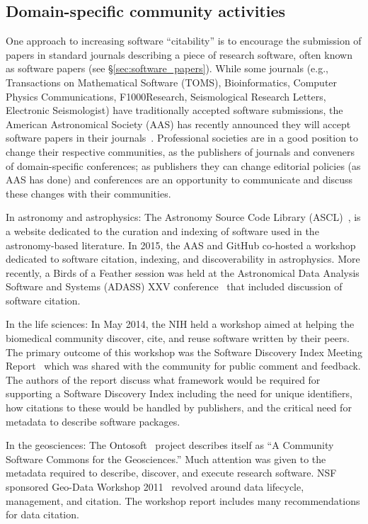 \documentclass[12pt, oneside]{amsart}
\begin{document}
\subsection{Domain-specific community activities}

One approach to increasing software ``citability'' is to encourage the
submission of papers in standard journals describing a piece of research
software, often known as software papers (see \S\ref{sec:software_papers}).
While some journals (e.g., Transactions on Mathematical Software (TOMS),
Bioinformatics, Computer Physics Communications, F1000Research,
Seismological Research Letters, Electronic Seismologist) have
traditionally accepted software submissions, the American Astronomical Society
(AAS) has recently announced they will accept software papers in their
journals~\cite{aas-sofware-papers}. Professional societies are in a good
position to change their respective communities, as the publishers of journals
and conveners of domain-specific conferences; as publishers they can change
editorial policies (as AAS has done) and conferences are an opportunity to
communicate and discuss these changes with their communities.

In astronomy and astrophysics: The Astronomy Source Code Library
(ASCL)~\cite{ascl}, is a website dedicated to the curation and indexing of
software used in the astronomy-based literature. In 2015, the AAS and GitHub
co-hosted a workshop~\cite{aas-software-index} dedicated to software citation,
indexing, and discoverability in astrophysics. More recently, a Birds of a Feather session was
held at the Astronomical Data Analysis Software and Systems (ADASS) XXV
conference~\cite{2015arXiv151207919A} that included discussion of software
citation.

In the life sciences: In May 2014, the NIH held a workshop aimed at helping the
biomedical community discover, cite, and reuse software written by their peers.
The primary outcome of this workshop was the Software Discovery Index Meeting
Report~\cite{software-discovery-index} which was shared with the community for
public comment and feedback. The authors of the report discuss
what framework would be required for supporting a Software Discovery Index
including the need for unique identifiers, how citations to these would be
handled by publishers, and the critical need for metadata to describe software
packages.

In the geosciences: The Ontosoft~\cite{ontosoft} project describes itself as ``A
Community Software Commons for the Geosciences.'' Much attention was given to the
metadata required to describe, discover, and execute research software. NSF sponsored
Geo-Data Workshop 2011~\cite{nsf-geo-data} revolved around data lifecycle, management, and
citation. The workshop report includes many recommendations for data
citation.
\end{document}

